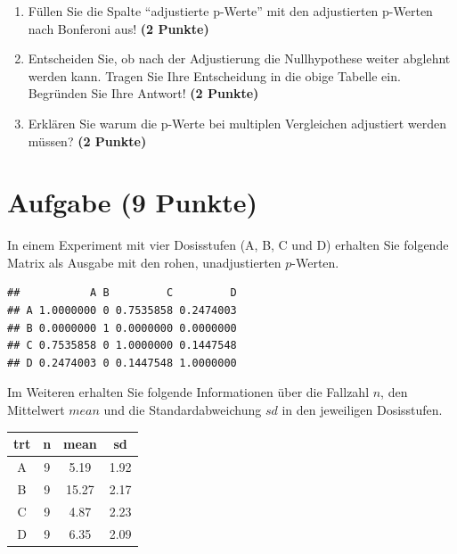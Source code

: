 \documentclass[a4paper, 10pt]{scrartcl}\usepackage[]{graphicx}\usepackage[]{xcolor}
\makeatletter
\newenvironment{kframe}{%
 \def\at@end@of@kframe{}%
 \ifinner\ifhmode%
  \def\at@end@of@kframe{\end{minipage}}%
  \begin{minipage}{\columnwidth}%
 \fi\fi%
 \def\FrameCommand##1{\hskip\@totalleftmargin \hskip-\fboxsep
 \colorbox{shadecolor}{##1}\hskip-\fboxsep
     \hskip-\linewidth \hskip-\@totalleftmargin \hskip\columnwidth}%
 \MakeFramed {\advance\hsize-\width
   \@totalleftmargin\z@ \linewidth\hsize
   \@setminipage}}%
 {\par\unskip\endMakeFramed%
 \at@end@of@kframe}
\newenvironment{knitrout}{}{} %
\makeatother
\begin{document}
\begin{enumerate}
\item F{\"u}llen Sie die Spalte "`adjustierte p-Werte"' mit den adjustierten
  p-Werten nach Bonferoni aus! \textbf{(2 Punkte)}
\item Entscheiden Sie, ob nach der Adjustierung die Nullhypothese weiter
  abglehnt werden kann. Tragen Sie Ihre Entscheidung in die obige Tabelle
  ein. Begr{\"u}nden Sie Ihre Antwort! \textbf{(2 Punkte)}
\item Erkl{\"a}ren Sie warum die p-Werte bei multiplen Vergleichen
  adjustiert werden m{\"u}ssen? \textbf{(2 Punkte)}
\end{enumerate}

\vspace{1Ex}

 
\clearpage

\section{Aufgabe \hfill (9 Punkte)}

In einem Experiment mit vier Dosisstufen (A, B, C und D) erhalten Sie
folgende Matrix als \Rlogo Ausgabe mit den rohen, unadjustierten $p$-Werten. 



\begin{knitrout}
\color{fgcolor}\begin{kframe}
\begin{verbatim}
##           A B         C         D
## A 1.0000000 0 0.7535858 0.2474003
## B 0.0000000 1 0.0000000 0.0000000
## C 0.7535858 0 1.0000000 0.1447548
## D 0.2474003 0 0.1447548 1.0000000
\end{verbatim}
\end{kframe}
\end{knitrout}

Im Weiteren erhalten Sie folgende Informationen {\"u}ber die Fallzahl $n$, den
Mittelwert $mean$ und die Standardabweichung $sd$ in den jeweiligen Dosisstufen.

\begin{knitrout}
\color{fgcolor}\begin{table}[!h]
\centering
\begin{tabular}{cccc}
\toprule
trt & n & mean & sd\\
\midrule
A & 9 & 5.19 & 1.92\\
B & 9 & 15.27 & 2.17\\
C & 9 & 4.87 & 2.23\\
D & 9 & 6.35 & 2.09\\
\bottomrule
\end{tabular}
\end{table}

\end{knitrout}
\end{document}
